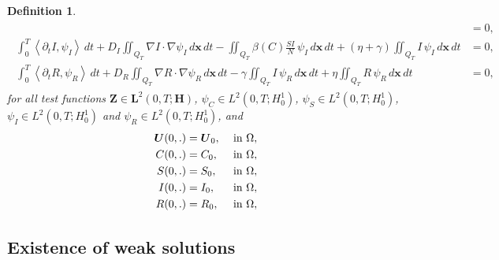 \documentclass[10pt,number,preprint,times]{elsarticle}
\numberwithin{equation}{section} %
\newtheorem{defi}{Definition}[section]
\begin{document}
\begin{defi}
\begin{eqnarray}
\begin{split}
				&=0,
				\\ 	  		
				\int_{0}^{T}	\left\langle\partial_t I, \psi_I \right\rangle\,  dt+ D_I\iint_{Q_T}\nabla I \cdot\nabla \psi_I\, d\mathbf{x}\, dt-\iint_{Q_T}\beta(C) \frac{SI}{N} \, \psi_I\, d\mathbf{x}\, dt + (\eta+\gamma) \iint_{Q_T} I \,\psi_I \, d\mathbf{x}\, dt
				&=0,
				\\ 	  		
			\int_{0}^{T}	\left\langle\partial_t R, \psi_R \right\rangle\,  dt+ D_R\iint_{Q_T}\nabla R \cdot\nabla \psi_R\, d\mathbf{x}\, dt-\gamma\iint_{Q_T} I \,\psi_R \, d\mathbf{x}\, dt+ \eta\iint_{Q_T} R \,\psi_R \, d\mathbf{x}\, dt
				&=0,
			\end{split} 
		\end{eqnarray}   
		for all test functions $\boldsymbol{Z} \in \mathbf{L}^2(0,T; \mathbf{H})$, $\psi_C \in L^2(0,T;  H^1_0)$, $\psi_S \in L^2(0,T;  H^1_0)$, $\psi_I \in L^2(0,T;  H^1_0)$ 
		and $\psi_R \in L^2(0,T;  H^1_0)$, and
		\begin{eqnarray}\label{eqvar2}
			\begin{split}
				\boldsymbol{U}(0,\mathbf{.}) &=\boldsymbol{U}_{0},  & \hbox { in }   \Omega, \\
				C(0,\mathbf{.}) &=C_{0},  & \hbox { in }   \Omega,
				\\
				S(0,\mathbf{.}) &=S_{0},  & \hbox { in }   \Omega, \\
				I(0,\mathbf{.}) &=I_{0},  & \hbox { in }   \Omega, \\
				R(0,\mathbf{.}) &=R_{0},  & \hbox { in }   \Omega,  
			\end{split}
		\end{eqnarray}
	\end{defi}
	
	
	\subsection{Existence of weak solutions}
	
\end{document}
